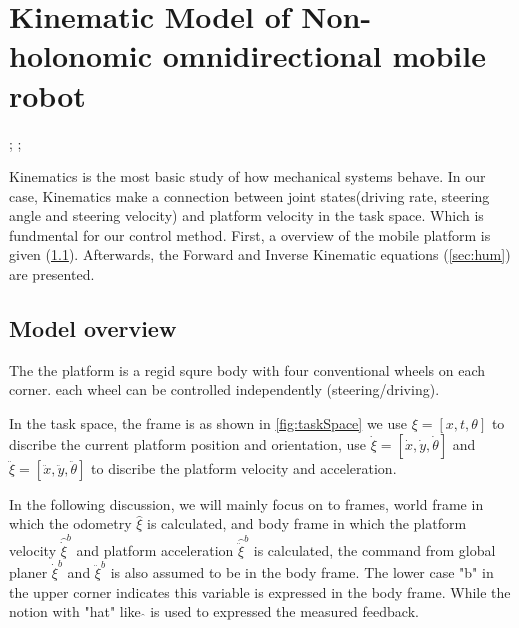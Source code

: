 \chapter{Kinematic Model of Non-holonomic omnidirectional mobile robot}
\label{cha:Kinematic}


;
;


Kinematics is the most basic study of how mechanical systems behave. In our case, Kinematics make a connection between joint states(driving rate, steering angle and steering velocity) and platform velocity in the 
task space. Which is fundmental for our control method.
First, a overview of the mobile platform is given (\cref{sec:model_overview}).
Afterwards, the Forward and Inverse Kinematic equations (\cref{sec:hum}) are presented.

\section{Model overview}
\label{sec:model_overview}

The the platform is a regid squre body with four conventional wheels on each corner. each wheel can be controlled independently (steering/driving).

In the task space, the frame is as shown in \cref{fig:taskSpace} we use $ \xi = [x,t,\theta]$ to discribe the current platform position and orientation, use $ \dot{\xi} = [\dot{x},\dot{y},\dot{\theta}] $ and 
$ \ddot{\xi}= [\ddot{x},\ddot{y},\ddot{\theta}] $ to discribe the platform velocity and acceleration. 

In the following discussion, we will mainly focus on to frames, world frame in which the odometry $ \hat{\xi} $ is calculated, and body frame in which the platform velocity $\hat{\dot{\xi}}^b$ and platform 
acceleration $ \hat{\ddot{\xi}}^b $ is calculated, the command from global planer $ \dot{\xi}^b $ and $ \ddot{\xi}^b $ is also assumed to be in the body frame. The lower case "b" in the upper corner indicates 
this variable is expressed in the body frame. While the notion with "hat" like $\hat{}$ is used to expressed the measured feedback.



